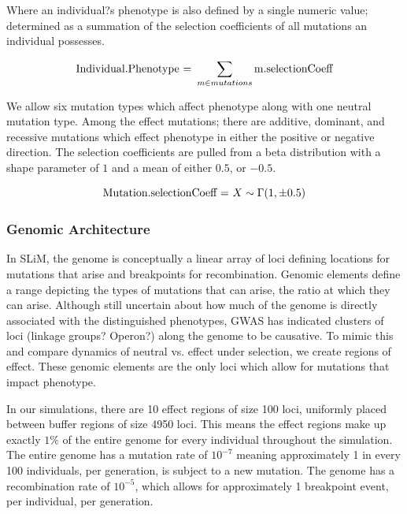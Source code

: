 \documentclass{article}
\begin{document}
Where an individual?s phenotype is also defined by a single numeric value; 
determined as a summation of the selection coefficients of all mutations an individual possesses. 

	\[
{\textnormal{Individual.Phenotype = } \sum_{m \in mutations} \textnormal{m.selectionCoeff}}
	\]
    
    
We allow six mutation types which affect phenotype along with one neutral mutation type.
Among the effect mutations; 
there are additive, dominant, and recessive mutations which effect phenotype
in either the positive or negative direction. 
The selection coefficients are pulled from a beta distribution 
with a shape parameter of $1$ and a mean of either $0.5$, or ${-0.5}$. 

	\[
\textnormal{Mutation.selectionCoeff = } X \sim \Gamma (1,\pm0.5)
	\]


\subsubsection{Genomic Architecture}

In SLiM, the genome is conceptually a linear array of loci defining locations for 
mutations that arise and breakpoints for recombination. 
Genomic elements define a range depicting the types of mutations that can arise, the ratio at which they can arise. 
Although still uncertain about how much of the genome is directly associated with the distinguished phenotypes, 
GWAS has indicated clusters of loci (linkage groups? Operon?) along the genome to be causative. 
To mimic this and compare dynamics of neutral vs. effect under selection, 
we create regions of effect. 
These genomic elements are the only loci which allow for mutations that impact phenotype. 

In our simulations, there are 10 effect regions of size 100 loci, uniformly placed between buffer regions of size 4950 loci. 
This means the effect regions make up exactly $1\%$ of the entire genome for every individual throughout the simulation. 
The entire genome has a mutation rate of $10^{-7}$ meaning approximately 1 in every 100 individuals, per generation, is subject to a new mutation. 
The genome has a recombination rate of $10^{-5}$, which allows for approximately 1 breakpoint event, per individual, per generation. 
\end{document}
